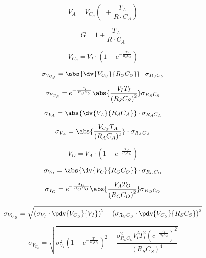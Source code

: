 

\begin{equation}
V_A=V_{C_S}\left(1+\frac{T_A}{R \cdot C_A}\right) \label{eq1}
\end{equation}


\begin{equation}
G=1+\frac{T_A}{R \cdot C_A} \label{eq2}
\end{equation}


\begin{equation}
V_{C_{S}} = V_I \cdot \left( 1-{e^{-{\frac {T_I}{R_S C_S}}}} \right)   
\end{equation}

\begin{equation}
\sigma_{V_{C_{S}}} = \abs{\dv{V_{C_{S}}}{R_S C_S}} \cdot \sigma_{R_S C_S}
\end{equation}

\begin{equation}
\sigma_{V_{C_{S}}} = e^{-{\frac {T_I}{R_S C_S}}} \abs{\frac{V_I T_I}{{(R_S C_S)}^2}} \sigma_{R_S C_S}
\end{equation}


\begin{equation}
\sigma_{V_A} = \abs{\dv{V_A}{R_A C_A}} \cdot \sigma_{R_A C_A}
\end{equation}

\begin{equation}
\sigma_{V_A} = \abs{\frac{V_{C_{S}}T_A}{(R_A C_A)^2}} \cdot \sigma_{R_A C_A}
\end{equation}


\begin{equation}
V_O = V_A \cdot \left( 1-{e^{-{\frac {T_O}{R_O C_O}}}} \right)   
\end{equation}

\begin{equation}
\sigma_{V_O} = \abs{\dv{V_O}{R_O C_O}} \cdot \sigma_{R_O C_O}
\end{equation}


\begin{equation}
\sigma_{V_O} = e^{-{\frac {T_O}{R_O C_O}}} \abs{\frac{V_A T_O}{{(R_O C_O)}^2}} \sigma_{R_O C_O}
\end{equation}

\begin{equation}
\sigma_{V_{C_{S}}} = \sqrt{\left( \sigma_{V_I} \cdot \pdv{V_{C_S}}{V_I} \right)^2 + \left( \sigma_{R_S C_S} \cdot \pdv{V_{C_S}}{R_S C_S} \right)^2}
\end{equation}

\begin{equation}
\sigma_{V_{C_{S}}} = \sqrt{ \sigma_{V_I}^2 \left(1-e^{-{\frac{T_I}{R_S C_S}}} \right)^2 + \frac{\sigma_{R_S C_S}^2 V_I^2 T_I^2 \left(e^{-{\frac{T_I}{R_S C_S}}}\right)^2}{(R_S C_S)^4}}
\end{equation}

